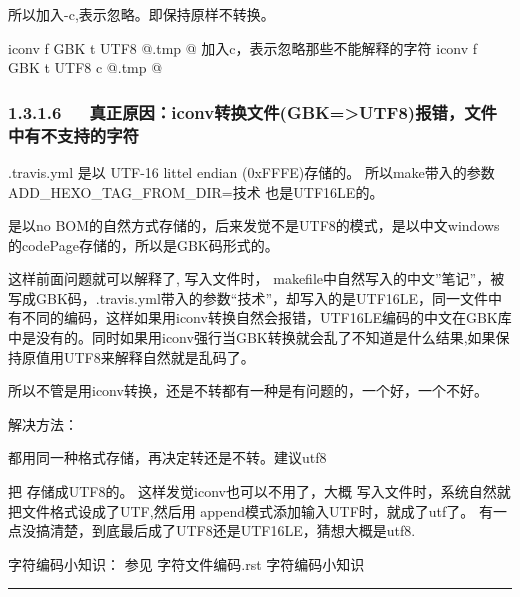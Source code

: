 \documentclass[letterpaper,12pt,english]{sphinxmanual}
\begin{document}
所以加入-c,表示忽略。即保持原样不转换。

\begin{sphinxVerbatim}[commandchars=\\\{\}]
\PYGZsh{}   iconv \PYGZhy{}f GBK \PYGZhy{}t UTF\PYGZhy{}8 \PYGZdl{}\PYGZdl{}@.tmp \PYGZgt{}\PYGZdl{}\PYGZdl{}@
\PYGZsh{} 加入\PYGZhy{}c，表示忽略那些不能解释的字符
    iconv \PYGZhy{}f GBK \PYGZhy{}t UTF\PYGZhy{}8 \PYGZhy{}c \PYGZdl{}\PYGZdl{}@.tmp \PYGZgt{}\PYGZdl{}\PYGZdl{}@
\end{sphinxVerbatim}


\subsubsection{1.3.1.6   真正原因：iconv转换文件(GBK=\textgreater{}UTF8)报错，文件中有不支持的字符}
\label{\detokenize{001software/001install/001._u7f51_u7ad9/travisCI:id4}}
.travis.yml 是以 UTF-16 littel endian (0xFFFE)存储的。 所以make带入的参数 ADD\_HEXO\_TAG\_FROM\_DIR=技术 也是UTF16LE的。

 是以no BOM的自然方式存储的，后来发觉不是UTF8的模式，是以中文windows的codePage存储的，所以是GBK码形式的。

这样前面问题就可以解释了,   写入文件时， makefile中自然写入的中文”笔记”，被写成GBK码，.travis.yml带入的参数“技术”，却写入的是UTF16LE，同一文件中有不同的编码，这样如果用iconv转换自然会报错，UTF16LE编码的中文在GBK库中是没有的。同时如果用iconv强行当GBK转换就会乱了不知道是什么结果,如果保持原值用UTF8来解释自然就是乱码了。

所以不管是用iconv转换，还是不转都有一种是有问题的，一个好，一个不好。

解决方法：

都用同一种格式存储，再决定转还是不转。建议utf8

把  存储成UTF8的。
这样发觉iconv也可以不用了，大概  写入文件时，系统自然就把文件格式设成了UTF,然后用  append模式添加输入UTF时，就成了utf了。 有一点没搞清楚，到底最后成了UTF8还是UTF16LE，猜想大概是utf8.

字符编码小知识： 参见 字符文件编码.rst 字符编码小知识


\bigskip\hrule\bigskip
\end{document}
